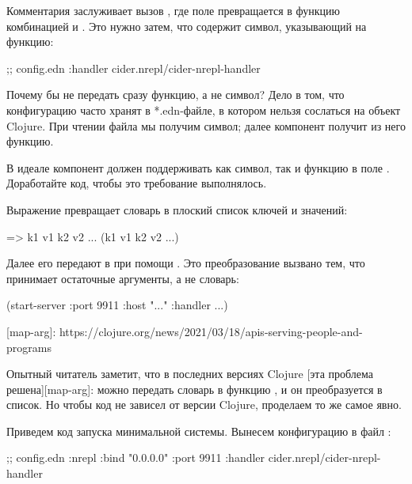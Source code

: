Комментария заслуживает вызов , где поле  превращается в функцию комбинацией  и . Это нужно затем, что  содержит символ, указывающий на функцию:

\begin{english}
  \begin{clojure}
;; config.edn
{:handler cider.nrepl/cider-nrepl-handler}
  \end{clojure}
\end{english}

Почему бы не передать сразу функцию, а не символ? Дело в том, что конфигурацию часто хранят в *.edn-файле, в котором нельзя сослаться на объект Clojure. При чтении файла мы получим символ; далее компонент получит из него функцию.

В идеале компонент должен поддерживать как символ, так и функцию в поле . Доработайте код, чтобы это требование выполнялось.

Выражение  превращает словарь в плоский список ключей и значений:

\begin{english}
  \begin{clojure}
=> {k1 v1 k2 v2 ...}
(k1 v1 k2 v2 ...)
  \end{clojure}
\end{english}

Далее его передают в  при помощи . Это преобразование вызвано тем, что  принимает остаточные аргументы, а не словарь:

\begin{english}
  \begin{clojure}
(start-server :port 9911 :host "..." :handler ...)
  \end{clojure}
\end{english}

[map-arg]: https://clojure.org/news/2021/03/18/apis-serving-people-and-programs

Опытный читатель заметит, что в последних версиях Clojure [эта проблема решена][map-arg]: можно передать словарь в функцию , и он преобразуется в список. Но чтобы код не зависел от версии Clojure, проделаем то же самое явно.

Приведем код запуска минимальной системы. Вынесем конфигурацию в файл :

\begin{english}
  \begin{clojure}
;; config.edn
{:nrepl {:bind "0.0.0.0"
         :port 9911
         :handler cider.nrepl/cider-nrepl-handler}}
  \end{clojure}
\end{english}

